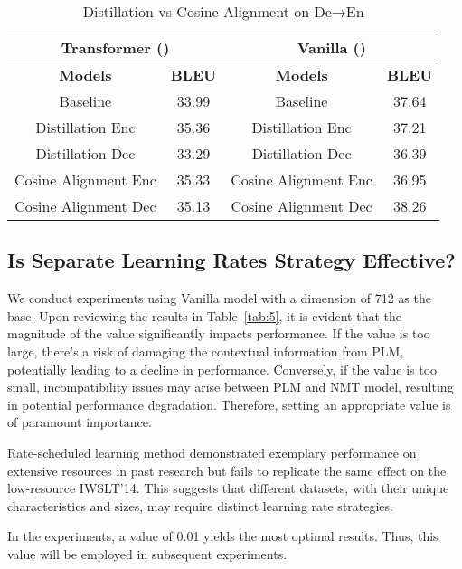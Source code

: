 \documentclass[conference]{IEEEtran}
\begin{document}
\begin{table}[!tb]
\renewcommand{\arraystretch}{1.3} \centering
\caption{Distillation vs Cosine Alignment on De→En}
\label{tab:4}
\begin{tabular}{|c|c|c|c|}
\hline
\multicolumn{2}{|c|}{\textbf{Transformer ()}} & \multicolumn{2}{|c|}{\textbf{Vanilla ()}} \\
\hline
\textbf{Models} & \textbf{BLEU} & \textbf{Models} & \textbf{BLEU} \\
\hline
Baseline & 33.99 & Baseline & 37.64 \\
Distillation Enc & 35.36 & Distillation Enc & 37.21 \\
Distillation Dec & 33.29 & Distillation Dec & 36.39 \\
Cosine Alignment Enc & 35.33 & Cosine Alignment Enc & 36.95 \\
Cosine Alignment Dec & 35.13 & Cosine Alignment Dec & 38.26 \\
\hline
\end{tabular}
\end{table}

\subsection{Is Separate Learning Rates Strategy Effective?}
We conduct experiments using Vanilla model with a dimension of 712 as the base. Upon reviewing the results in Table~\ref{tab:5}, it is evident that the magnitude of the  value significantly impacts performance. If the  value is too large, there's a risk of damaging the contextual information from PLM, potentially leading to a decline in performance. Conversely, if the  value is too small, incompatibility issues may arise between PLM and NMT model, resulting in potential performance degradation. Therefore, setting an appropriate  value is of paramount importance.

Rate-scheduled learning method \cite{Yang2019} demonstrated exemplary performance on extensive resources in past research but fails to replicate the same effect on the low-resource IWSLT'14. This suggests that different datasets, with their unique characteristics and sizes, may require distinct learning rate strategies.

In the experiments, a  value of 0.01 yields the most optimal results. Thus, this value will be employed in subsequent experiments.
\end{document}
